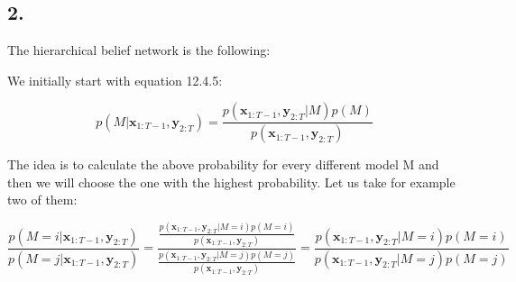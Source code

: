 \documentclass[11pt,a4paper,oneside]{report}
\begin{document}
\subsection*{2.}

The hierarchical belief network is the following:

\begin{center}
\end{center}
	
We initially start with equation 12.4.5:

$$p(M|\mathbf{x}_{1:T-1},\mathbf{y}_{2:T})=\frac{p(\mathbf{x}_{1:T-1},\mathbf{y}_{2:T}|M)p(M)}{p(\mathbf{x}_{1:T-1},\mathbf{y}_{2:T})}$$

The idea is to calculate the above probability for every different model M and then we will choose the one with the highest probability. Let us take for example two of them:

$$\frac{p(M=i|\mathbf{x}_{1:T-1},\mathbf{y}_{2:T})}{p(M=j|\mathbf{x}_{1:T-1},\mathbf{y}_{2:T})}=\frac{\frac{p(\mathbf{x}_{1:T-1},\mathbf{y}_{2:T}|M=i)p(M=i)}{p(\mathbf{x}_{1:T-1},\mathbf{y}_{2:T})}}{\frac{p(\mathbf{x}_{1:T-1},\mathbf{y}_{2:T}|M=j)p(M=j)}{p(\mathbf{x}_{1:T-1},\mathbf{y}_{2:T})}}=\frac{p(\mathbf{x}_{1:T-1},\mathbf{y}_{2:T}|M=i)p(M=i)}{p(\mathbf{x}_{1:T-1},\mathbf{y}_{2:T}|M=j)p(M=j)}$$
\end{document}
